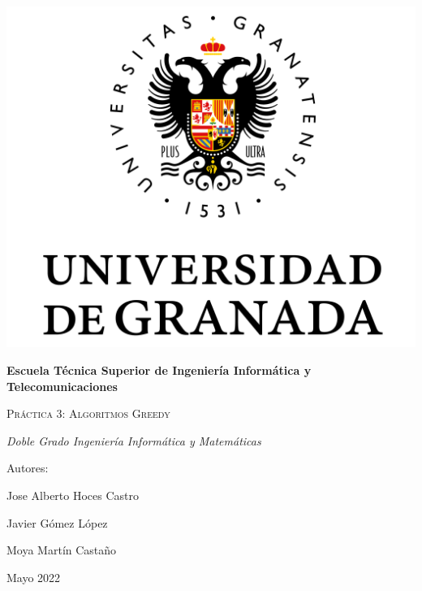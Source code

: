 \documentclass[10pt,a4paper]{article}
\begin{document}
	
\begin{titlepage}
	\centering
	{\includegraphics[scale=0.5]{Logo_UGR.png}\par}
	\vspace{1cm}
	{\bfseries\Large Escuela T\'ecnica Superior de Ingeniería Informática y Telecomunicaciones \par}
	\vspace{2.5cm}
	{\scshape\Huge Pr\'actica 3: Algoritmos Greedy \par}
	\vspace{3cm}
	{\itshape\Large Doble Grado Ingeniería Informática y Matemáticas}
	\vfill
	{\Large Autores: \par}
	{\Large Jose Alberto Hoces Castro\par}
	{\Large Javier Gómez López \par}
	{\Large Moya Mart\'in Castaño \par}
	\vfill
	{\Large Mayo 2022 \par}
\end{titlepage}

\thispagestyle{empty}
\null
\vfill
\end{document}
